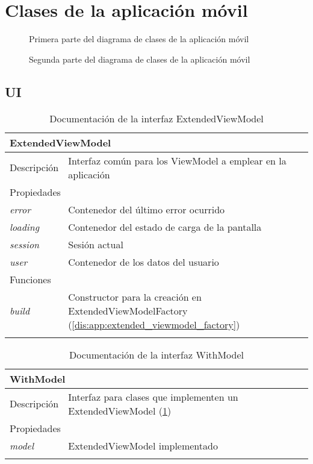 \section{Clases de la aplicación móvil}

\begin{figure}[H]
    \centering
    \caption{Primera parte del diagrama de clases de la aplicación móvil}
    \label{fig:diagrama_clases_app_a}
\end{figure}

\begin{figure}[H]
    \centering
    \caption{Segunda parte del diagrama de clases de la aplicación móvil}
    \label{fig:diagrama_clases_app_b}
\end{figure}

\newpage
\subsection{UI}

\begin{longtable}{|p{} p{}|}
    \hline
    \multicolumn{2}{|l|}{\textbf{ExtendedViewModel}} \\ \hline \hline
    Descripción      & Interfaz común para los ViewModel a emplear en la aplicación \\ \hline
    \multicolumn{2}{|l|}{Propiedades} \\
    \emph{error}  & Contenedor del último error ocurrido  \\ 
    \emph{loading}  & Contenedor del estado de carga de la pantalla  \\ 
    \emph{session}  & Sesión actual \\ 
    \emph{user}  & Contenedor de los datos del usuario  \\ \hline
    \multicolumn{2}{|l|}{Funciones} \\
    \emph{build}  & Constructor para la creación en ExtendedViewModelFactory (\ref{dis:app:extended_viewmodel_factory})  \\ \hline
    \caption{Documentación de la interfaz ExtendedViewModel}
    \label{dis:app:extended_viewmodel}
\end{longtable}

\begin{longtable}{|p{} p{}|}
    \hline
    \multicolumn{2}{|l|}{\textbf{WithModel}} \\ \hline \hline
    Descripción      & Interfaz para clases que implementen un ExtendedViewModel (\ref{dis:app:extended_viewmodel}) \\ \hline
    \multicolumn{2}{|l|}{Propiedades} \\
    \emph{model}  & ExtendedViewModel implementado  \\ \hline
    \caption{Documentación de la interfaz WithModel}
    \label{dis:app:with_model}
\end{longtable}

